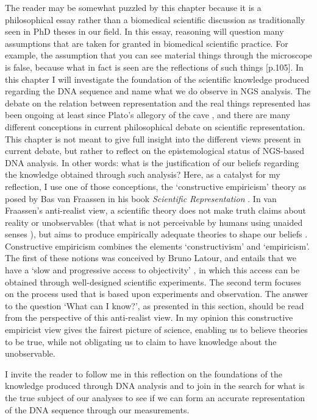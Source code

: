 \noindent The reader may be somewhat puzzled by this chapter because it is a philosophical essay rather than a biomedical scientific discussion as traditionally seen in PhD theses in our field. 
In this essay, reasoning will question many assumptions that are taken for granted in biomedical scientific practice. 
For example, the assumption that you can see material things through the microscope is false, because what in fact is seen are the reflections of such things \cite{Fraassen_2008}[p.105]. 
In this chapter I will investigate the foundation of the scientific knowledge produced regarding the DNA sequence and name what we do observe in NGS analysis.
The debate on the relation between representation and the real things represented has been ongoing at least since Plato’s allegory of the cave \cite{Plato_350BC}, and there are many different conceptions in current philosophical debate on scientific representation\cite{sep-scientific-representation}. 
This chapter is not meant to give full insight into the different views present in current debate, but rather to reflect on the epistemological status of NGS-based DNA analysis. 
In other words: what is the justification of our beliefs regarding the knowledge obtained through such analysis? Here, as a catalyst for my reflection, I use one of those conceptions, the ‘constructive empiricism’ theory as posed by Bas van Fraassen in his book \textsl{Scientific Representation} \cite{Fraassen_2008}. 
In van Fraassen’s anti-realist view, a scientific theory does not make truth claims about reality or unobservables (that what is not perceivable by humans using unaided senses \cite{sep-scientific-realism}), but aims to produce empirically adequate theories to shape our beliefs \cite{sep-constructive-empiricism}. 
Constructive empiricism combines the elements ‘constructivism’ and ‘empiricism’. The first of these notions was conceived by Bruno Latour, and entails that we have a ‘slow and progressive access to objectivity’ \cite{Latour_2003}, in which this access can be obtained through well-designed scientific experiments. 
The second term focuses on the process used that is based upon experiments and observation. 
The answer to the question ‘What can I know?’, as presented in this section, should be read from the perspective of this anti-realist view. 
In my opinion this constructive empiricist view gives the fairest picture of science, enabling us to believe theories to be true, while not obligating us to claim to have knowledge about the unobservable. 

I invite the reader to follow me in this reflection on the foundations of the knowledge produced through DNA analysis and to join in the search for what is the true subject of our analyses to see if we can form an accurate representation of the DNA sequence through our measurements.

